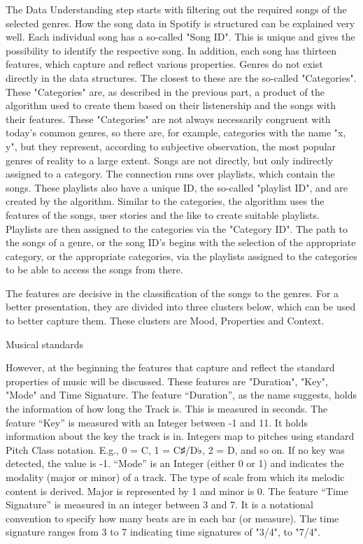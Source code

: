 The Data Understanding step starts with filtering out the required songs of the selected genres. 
How the song data in Spotify is structured can be explained very well.
Each individual song has a so-called "Song ID". 
This is unique and gives the possibility to identify the respective song.
In addition, each song has thirteen features, which capture and reflect various properties. 
Genres do not exist directly in the data structures. The closest to these are the so-called "Categories". 
These "Categories" are, as described in the previous part, a product of the algorithm used
to create them based on their listenership and the songs with their features. 
These "Categories" are not always necessarily congruent with today's common genres,
so there are, for example, categories with the name "x, y", but they represent, 
according to subjective observation, the most popular genres of reality to a large extent.
Songs are not directly, but only indirectly assigned to a category. 
The connection runs over playlists, which contain the songs.
These playlists also have a unique ID, the so-called "playlist ID", and are created by the algorithm. 
Similar to the categories, the algorithm uses the features of the songs,
user stories and the like to create suitable playlists. 
Playlists are then assigned to the categories via the "Category ID".
The path to the songs of a genre, or the song ID's begins with the selection of the appropriate category,
or the appropriate categories, via the playlists assigned to the categories
to be able to access the songs from there.

The features are decisive in the classification of the songs to the genres.
For a better presentation, they are divided into three clusters below, 
which can be used to better capture them. These clusters are Mood, Properties and Context.

Musical standards

However, at the beginning the features that capture and reflect the standard properties of music will
be discussed. These features are "Duration", "Key", "Mode" and Time Signature. 
The feature “Duration”, as the name suggests, holds the information of how long the Track is.
This is measured in seconds. The feature “Key” is measured with an Integer between -1 and 11.
It holds information about the key the track is in. Integers map to pitches using
standard Pitch Class notation. 
E.g., 0 = C, 1 = C♯/D♭, 2 = D, and so on. If no key was detected, the value is -1.
“Mode” is an Integer (either 0 or 1) and indicates the modality (major or minor) of a track. 
The type of scale from which its melodic content is derived. Major is represented by 1 and minor is 0. 
The feature “Time Signature” is measured in an integer between 3 and 7.
It is a notational convention to specify how many beats are in each bar (or measure). 
The time signature ranges from 3 to 7 indicating time signatures of "3/4", to "7/4".

